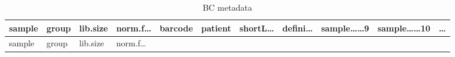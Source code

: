 \documentclass[
]{article}
\begin{document}
\begin{longtable}[]{@{}lllllllllll@{}}
\caption{\label{tab:BC-metadata}BC metadata}\tabularnewline
\toprule
\begin{minipage}[b]{0.07\columnwidth}\raggedright
sample\strut
\end{minipage} & \begin{minipage}[b]{0.04\columnwidth}\raggedright
group\strut
\end{minipage} & \begin{minipage}[b]{0.06\columnwidth}\raggedright
lib.size\strut
\end{minipage} & \begin{minipage}[b]{0.07\columnwidth}\raggedright
norm.f\ldots{}\strut
\end{minipage} & \begin{minipage}[b]{0.07\columnwidth}\raggedright
barcode\strut
\end{minipage} & \begin{minipage}[b]{0.07\columnwidth}\raggedright
patient\strut
\end{minipage} & \begin{minipage}[b]{0.07\columnwidth}\raggedright
shortL\ldots{}\strut
\end{minipage} & \begin{minipage}[b]{0.07\columnwidth}\raggedright
defini\ldots{}\strut
\end{minipage} & \begin{minipage}[b]{0.09\columnwidth}\raggedright
sample\ldots\ldots9\strut
\end{minipage} & \begin{minipage}[b]{0.10\columnwidth}\raggedright
sample\ldots\ldots10\strut
\end{minipage} & \begin{minipage}[b]{0.03\columnwidth}\raggedright
\ldots{}\strut
\end{minipage}\tabularnewline
\midrule
\endfirsthead
\toprule
\begin{minipage}[b]{0.07\columnwidth}\raggedright
sample\strut
\end{minipage} & \begin{minipage}[b]{0.04\columnwidth}\raggedright
group\strut
\end{minipage} & \begin{minipage}[b]{0.06\columnwidth}\raggedright
lib.size\strut
\end{minipage} & \begin{minipage}[b]{0.07\columnwidth}\raggedright
norm.f\ldots{}\strut

\end{minipage}
\end{longtable}
\end{document}
